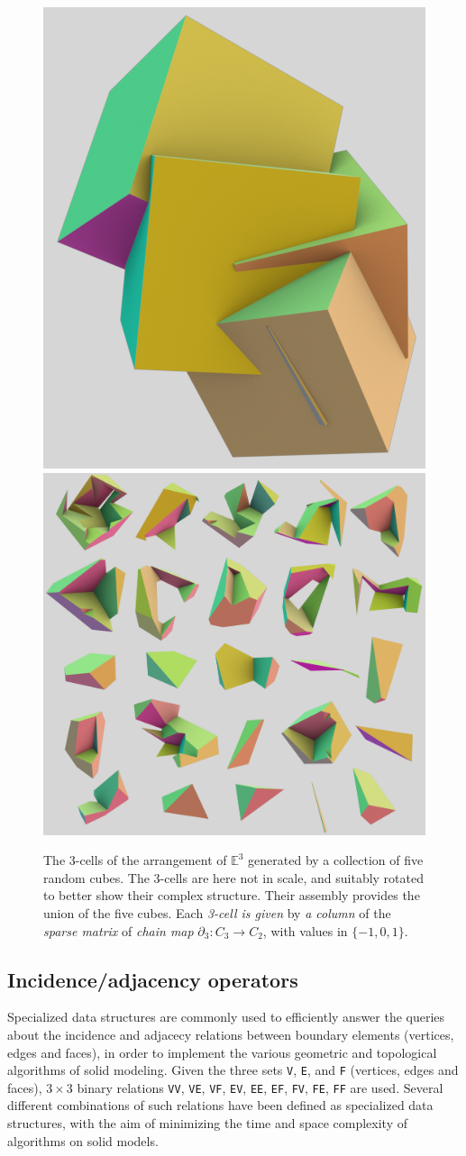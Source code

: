 \documentclass{juliacon}
\def\E{\mathbb{E}}
\begin{document}
\begin{figure}[htbp] %
   \centering
   \includegraphics[width=0.4\linewidth]{figs/image1.png}%
   \includegraphics[width=0.6\linewidth]{figs/image2.png}%
   \caption{The 3-cells of the arrangement of $\E^3$ generated by a collection of five random cubes.
   The 3-cells are here not in scale, and suitably rotated to better show their complex structure.
   Their assembly provides the union of the five cubes.
   Each \emph{3-cell is given} by \emph{a column} of the \emph{sparse matrix} of \emph{chain map} $\partial_3: C_3\to C_2$,  with values in $\{-1,0,1\}$.}
   \label{fig:example}
\end{figure}



\subsection{Incidence/adjacency operators}
Specialized data structures are commonly used to efficiently answer the queries about the incidence and adjacecy relations between boundary elements (vertices, edges and faces), in order to implement the various geometric and topological algorithms of solid modeling. Given the three sets \texttt{V}, \texttt{E}, and \texttt{F} (vertices, edges and faces), ${3\times 3}$ binary relations \texttt{VV}, \texttt{VE}, \texttt{VF}, \texttt{EV}, \texttt{EE}, \texttt{EF}, \texttt{FV}, \texttt{FE}, \texttt{FF} are used. Several different combinations of such relations have been defined as specialized data structures, with the aim of minimizing the time and space complexity of algorithms on solid models.
\end{document}

